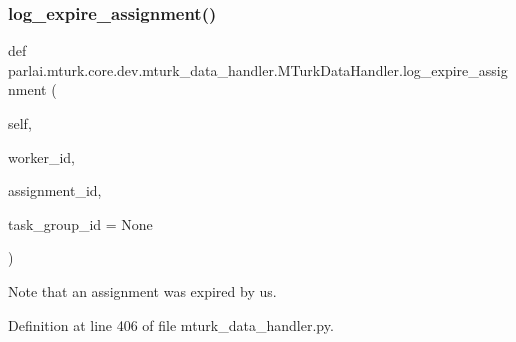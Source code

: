 \subsubsection{\texorpdfstring{log\+\_\+expire\+\_\+assignment()}{log\_expire\_assignment()}}
{\footnotesize\ttfamily def parlai.\+mturk.\+core.\+dev.\+mturk\+\_\+data\+\_\+handler.\+M\+Turk\+Data\+Handler.\+log\+\_\+expire\+\_\+assignment (\begin{DoxyParamCaption}\item[{}]{self,  }\item[{}]{worker\+\_\+id,  }\item[{}]{assignment\+\_\+id,  }\item[{}]{task\+\_\+group\+\_\+id = {\ttfamily None} }\end{DoxyParamCaption})}

\begin{DoxyVerb}Note that an assignment was expired by us.
\end{DoxyVerb}
 

Definition at line 406 of file mturk\+\_\+data\+\_\+handler.\+py.


